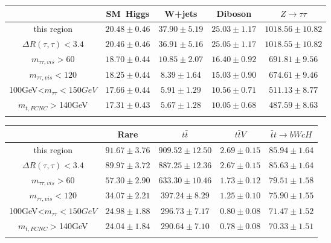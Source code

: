 \centering
\begin{tabular}{ccccc} \toprule\toprule
 & SM~Higgs & W+jets & Diboson & $Z\to \tau\tau$\\\midrule
 this region & $20.48\pm0.46$ & $37.90\pm5.19$ & $25.03\pm1.17$ & $1018.56\pm10.82$\\
$\Delta R(\tau,\tau)<3.4$ & $20.46\pm0.46$ & $36.91\pm5.16$ & $25.05\pm1.17$ & $1018.55\pm10.82$\\
$m_{\tau\tau,vis}>60$ & $18.70\pm0.44$ & $10.85\pm2.07$ & $16.40\pm0.92$ & $691.81\pm9.56$\\
$m_{\tau\tau,vis}<120$ & $18.25\pm0.44$ & $8.39\pm1.64$ & $15.03\pm0.90$ & $674.61\pm9.46$\\
100GeV<$m_{\tau\tau}<150GeV$ & $17.66\pm0.44$ & $5.91\pm1.29$ & $10.56\pm0.71$ & $511.13\pm8.77$\\
$m_{t,FCNC}>$140GeV & $17.31\pm0.43$ & $5.67\pm1.28$ & $10.05\pm0.68$ & $487.59\pm8.63$\\
\bottomrule\bottomrule\\
\end{tabular}
\begin{tabular}{ccccc} \toprule\toprule
 & Rare & $t\bar{t}$ & $t\bar{t}V$ & $\bar{t}t\to bWcH$\\\midrule
this region & $91.67\pm3.76$ & $909.52\pm12.50$ & $2.69\pm0.15$ & $85.94\pm1.64$\\
$\Delta R(\tau,\tau)<3.4$ & $89.97\pm3.72$ & $887.25\pm12.36$ & $2.67\pm0.15$ & $85.63\pm1.64$\\
$m_{\tau\tau,vis}>60$ & $57.30\pm2.90$ & $633.30\pm10.46$ & $1.73\pm0.12$ & $79.51\pm1.58$\\
$m_{\tau\tau,vis}<120$ & $34.07\pm2.21$ & $397.24\pm8.29$ & $1.25\pm0.10$ & $75.90\pm1.55$\\
100GeV<$m_{\tau\tau}<150GeV$ & $24.98\pm1.88$ & $296.73\pm7.17$ & $0.80\pm0.08$ & $71.47\pm1.52$\\
$m_{t,FCNC}>$140GeV & $24.04\pm1.84$ & $290.64\pm7.10$ & $0.78\pm0.08$ & $70.33\pm1.51$\\
\bottomrule\bottomrule\\
\end{tabular}
